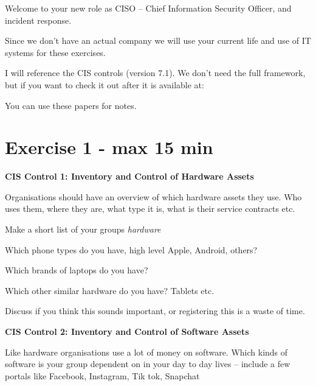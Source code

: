 \documentclass[a4paper,11pt,notitlepage,landscape]{report}
\begin{document}
\rm
{}

\newcommand{\subject}[1]{Intro to Incident Response - Track B}



\normal

Welcome to your new role as CISO -- Chief Information Security Officer, and incident response.

Since we don't have an actual company we will use your current life and use of IT systems for these exercises.

I will reference the CIS controls (version 7.1). We don't need the full framework, but if you want to check it out after it is available at: 

You can use these papers for notes.


\eject
\section*{Exercise 1 - max 15 min}

{\bf CIS Control 1: Inventory and Control of Hardware Assets}

Organisations should have an overview of which hardware assets they use. Who uses them, where they are, what type it is, what is their service contracts etc.

Make a short list of your groups  \emph{hardware}

\begin{list1}
\item[\faSquareO] Which phone types do you have, high level Apple, Android, others?
\item[\faSquareO] Which brands of laptops do you have?
\item[\faSquareO] Which other similar hardware do you have? Tablets etc.
\end{list1}

Discuss if you think this sounds important, or registering this is a waste of time.


{\bf CIS Control 2: Inventory and Control of Software Assets}

Like hardware organisations use a lot of money on software. Which kinds of software is your group dependent on in your day to day lives -- include a few portals like Facebook, Instagram, Tik tok, Snapchat
\end{document}
